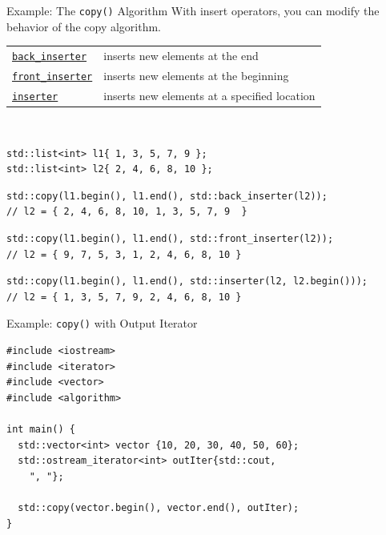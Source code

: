 \documentclass[14pt,aspectratio=1610]{beamer}
\begin{document}
\begin{frame}[fragile]{Example: The \texttt{copy()} Algorithm}
\small
With insert operators, you can modify the behavior of the copy algorithm.\\[0.5em]

\begin{tabular}{l l}
\href{https://en.cppreference.com/w/cpp/iterator/back_inserter}{\lstinline{back_inserter}} & inserts new elements at the end\\
\href{https://en.cppreference.com/w/cpp/iterator/front_inserter}{\lstinline{front_inserter}} & inserts new elements at the beginning\\
\href{https://en.cppreference.com/w/cpp/iterator/inserter}{\lstinline{inserter}} & inserts new elements at a specified location\\
\end{tabular}\\[1em]

\begin{lstlisting}[basicstyle=\small\ttfamily]
std::list<int> l1{ 1, 3, 5, 7, 9 };
std::list<int> l2{ 2, 4, 6, 8, 10 };
\end{lstlisting}

\begin{lstlisting}[basicstyle=\footnotesize\ttfamily]
std::copy(l1.begin(), l1.end(), std::back_inserter(l2));
// l2 = { 2, 4, 6, 8, 10, 1, 3, 5, 7, 9  }
\end{lstlisting}

\begin{lstlisting}[basicstyle=\footnotesize\ttfamily]
std::copy(l1.begin(), l1.end(), std::front_inserter(l2));
// l2 = { 9, 7, 5, 3, 1, 2, 4, 6, 8, 10 }
\end{lstlisting}

\begin{lstlisting}[basicstyle=\footnotesize\ttfamily]
std::copy(l1.begin(), l1.end(), std::inserter(l2, l2.begin()));
// l2 = { 1, 3, 5, 7, 9, 2, 4, 6, 8, 10 }
\end{lstlisting}
\end{frame}

\begin{frame}[fragile]{Example: \texttt{copy()} with Output Iterator}

\begin{lstlisting}[basicstyle=\small\ttfamily]
#include <iostream>
#include <iterator>
#include <vector>
#include <algorithm>

int main() {
  std::vector<int> vector {10, 20, 30, 40, 50, 60};
  std::ostream_iterator<int> outIter{std::cout,
    ", "};

  std::copy(vector.begin(), vector.end(), outIter);
}
\end{lstlisting}
\end{frame}
\end{document}
